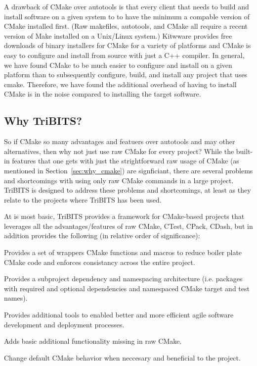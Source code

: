 \documentclass[10pt]{article}
\begin{document}
A drawback of CMake over autotools is that every client that needs to build and install software on a given system to to have the minimum a compable version of CMake installed first.  (Raw makefiles, autotools, and CMake all require a recent version of Make installed on a Unix/Linux system.)  Kitwware provides free downloads of binary installers for CMake for a variety of platforms and CMake is easy to configure and install from source with just a C++ compiler.  In general, we have found CMake to be much easier to configure and install on a given platform than to subsequently configure, build, and install any project that uses cmake.  Therefore, we have found the additional overhead of having to install CMake is in the noise compared to installing the target software.

%
\subsection{Why TriBITS?}
%

So if CMake so many advantages and featuers over autotools and may other alternatives, then why not just use raw CMake for every project?  While the built-in features that one gets with just the strightforward raw usage of CMake (as mentioned in Section~\ref{sec:why_cmake}) are signficiant, there are several problems and shortcomings with using only raw CMake commands in a large project.  TriBITS is designed to address these problems and shortcomings, at least as they relate to the projects where TriBITS has been used.

At is most basic, TriBITS provides a framework for CMake-based projects that leverages all the advantages/features of raw CMake, CTest, CPack, CDash, but in addition provides the following (in relative order of significance):

\begin{compactitem}
\item Provides a set of wrappers CMake functions and macros to reduce boiler plate CMake code and enforces consistancy across the entire project.
\item Provides a subproject dependency and namespacing architecture (i.e. packages with required and optional dependencies and namespaced CMake target and test names).
\item Provides additional tools to enabled better and more efficient agile software development and deployment processes.
\item Adds basic additional functionality missing in raw CMake.
\item Change default CMake behavior when neccesary and beneficial to the project.
\end{compactitem}
\end{document}
